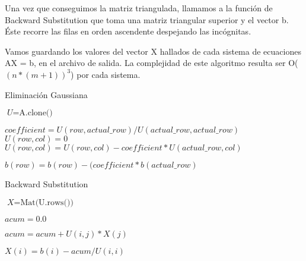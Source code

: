 Una vez que conseguimos la matriz triangulada, llamamos a la función de Backward Substitution que toma una matriz triangular superior y el vector b. Éste recorre las filas en orden ascendente despejando las incógnitas. 

Vamos guardando los valores del vector X hallados de cada sistema de ecuaciones AX = b, en el archivo de salida. La complejidad de este algoritmo resulta ser O($(n*(m+1))^{3}$) por cada sistema. 


\begin{algorithm}
\caption{Eliminación Gaussiana}\label{euclid}
\begin{algorithmic}[1]


    \State $\textit{U} = \text{A.clone()}$

        \Return
      \EndIf

          \State $coefficient = U(row, actual\_row) / U(actual\_row, actual\_row)$
              \State $U(row,col) = 0$
            \Else
              \State $U(row, col) = U(row, col) - coefficient * U(actual\_row, col)$
            \EndIf
          \EndFor

          \State $b(row) = b(row) - (coefficient * b(actual\_row)$
      \EndFor    
    \EndFor

  \EndFunction

\end{algorithmic}
\end{algorithm}

\begin{algorithm}
\caption{Backward Substitution}\label{euclid}
\begin{algorithmic}[1]


    \State $\textit{X} = \text{Mat(U.rows())}$

      \State $acum = 0.0$

        \State $acum = acum + U(i, j) * X(j)$
      \EndFor

      \State $X(i) = b(i) - acum / U(i, i)$

    \EndFor
      
  \EndFunction

\end{algorithmic}
\end{algorithm}



